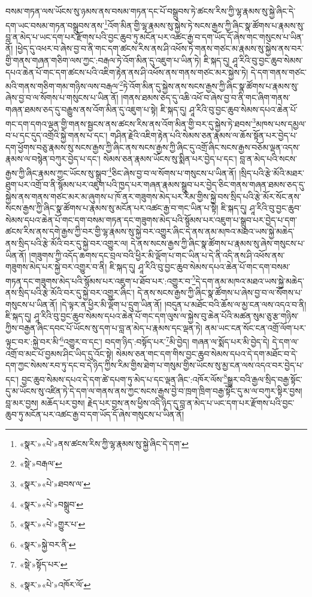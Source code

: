 བསམ་གཏན་ལས་ཡོངས་སུ་ཉམས་ནས་བསམ་གཏན་དང་པོ་བསྒྲུབས་ཏེ་ཚངས་རིས་ཀྱི་ལྷ་རྣམས་སུ་སྐྱེ་ཞིང་དེ་དག་ཡང་བསམ་གཏན་བསྒྲུབས་ནས་\footnote{«སྣར་»«པེ་»ནས་ཚངས་རིས་ཀྱི་ལྷ་རྣམས་སུ་སྐྱེ་ཞིང་དེ་དག་}འོག་མིན་གྱི་ལྷ་རྣམས་སུ་སྐྱེས་ཏེ་སངས་རྒྱས་ཀྱི་ཞིང་སྣ་ཚོགས་པ་རྣམས་སུ་བླ་ན་མེད་པ་ཡང་དག་པར་རྫོགས་པའི་བྱང་ཆུབ་ཏུ་མངོན་པར་འཚང་རྒྱ་བ་དག་ཡོད་དོ་ཞེས་གང་གསུངས་པ་ཡིན་ནོ། །ཕྱེད་དུ་འཕར་བ་ཞེས་བྱ་བ་ནི་གང་དག་ཚངས་རིས་ནས་ཤི་འཕོས་ཏེ་གནས་གཙང་མ་རྣམས་སུ་སྐྱེས་ནས་བར་གྱི་གནས་གཞན་གཅིག་ལས་ཀྱང་:བརྒལ་ཏེ་འོག་མིན་དུ་འཇུག་པ་ཡིན་ཏེ། ཇི་སྐད་དུ། ཤཱ་རིའི་བུ་བྱང་ཆུབ་སེམས་དཔའ་ཆེན་པོ་གང་དག་ཚངས་པའི་འཇིག་རྟེན་ནས་ཤི་འཕོས་ནས་གནས་གཙང་མར་སྐྱེས་ཏེ། དེ་དག་གནས་གཙང་མའི་གནས་གཅིག་གམ་གཉིས་ལས་བརྒལ་\footnote{«སྡེ་»བརྒལ་}ཏེ་འོག་མིན་དུ་སྐྱེས་ནས་སངས་རྒྱས་ཀྱི་ཞིང་སྣ་ཚོགས་པ་རྣམས་སུ་ཞེས་བྱ་བ་ལ་སོགས་པ་གསུངས་པ་ཡིན་ནོ། །གནས་ཐམས་ཅད་དུ་འཆི་འཕོ་བ་ཞེས་བྱ་བ་ནི་གང་ཞིག་གནས་གཞན་ཐམས་ཅད་དུ་བརྒྱུས་ནས་འོག་མིན་དུ་འཇུག་པ་སྟེ། ཇི་སྐད་དུ། ཤཱ་རིའི་བུ་བྱང་ཆུབ་སེམས་དཔའ་ཆེན་པོ་གང་དག་དགའ་ལྡན་གྱི་གནས་སྦྱངས་ནས་ཚངས་རིས་ནས་འོག་མིན་གྱི་བར་དུ་སྐྱེས་ཏེ་ཐབས་\footnote{«སྣར་»«པེ་»ཐབས་ལ་}མཁས་པས་དམྱལ་བ་པ་དང་དུད་འགྲོའི་སྐྱེ་གནས་པ་དང་། གཤིན་རྗེའི་འཇིག་རྟེན་པའི་སེམས་ཅན་རྣམས་ལ་ཆོས་སྟོན་པར་བྱེད་པ་དག་ཕྱོགས་བཅུ་རྣམས་སུ་སངས་རྒྱས་ཀྱི་ཞིང་ནས་སངས་རྒྱས་ཀྱི་ཞིང་དུ་འགྲོ་ཞིང་སངས་རྒྱས་བཅོམ་ལྡན་འདས་རྣམས་ལ་བསྙེན་བཀུར་བྱེད་པ་དང་། སེམས་ཅན་རྣམས་ཡོངས་སུ་སྨིན་པར་བྱེད་པ་དང་། བླ་ན་མེད་པའི་སངས་རྒྱས་ཀྱི་ཞིང་རྣམས་ཀྱང་ཡོངས་སུ་སྒྲུབ་\footnote{«སྣར་»«པེ་»བསྒྲུབ་}ཅིང་ཞེས་བྱ་བ་ལ་སོགས་པ་གསུངས་པ་ཡིན་ནོ། །སྲིད་པའི་རྩེ་མོའི་མཐར་ཐུག་པར་འགྲོ་བ་ནི་སྙོམས་པར་འཇུག་པའི་ཁྱད་པར་གཞན་རྣམས་སྒྲུབ་པར་བྱེད་ཅིང་གནས་གཞན་ཐམས་ཅད་དུ་སྐྱེས་ནས་གནས་གཙང་མར་མ་ཞུགས་པ་ཁོ་ནར་གཟུགས་མེད་པར་རིམ་གྱིས་སྐྱེ་བས་སྲིད་པའི་རྩེ་མོར་སོང་ནས་སངས་རྒྱས་ཀྱི་ཞིང་སྣ་ཚོགས་པ་རྣམས་སུ་མངོན་པར་འཚང་རྒྱ་བ་གང་ཡིན་པ་སྟེ། ཇི་སྐད་དུ། ཤཱ་རིའི་བུ་བྱང་ཆུབ་སེམས་དཔའ་ཆེན་པོ་གང་དག་བསམ་གཏན་དང་གཟུགས་མེད་པའི་སྙོམས་པར་འཇུག་པ་སྒྲུབ་པར་བྱེད་པ་དག་ཚངས་རིས་ནས་དགེ་རྒྱས་ཀྱི་བར་གྱི་ལྷ་རྣམས་སུ་སྐྱེ་བར་འགྱུར་ཞིང་དེ་ནས་ནམ་མཁའ་མཐའ་ཡས་སྐྱེ་མཆེད་ནས་སྲིད་པའི་རྩེ་མོའི་བར་དུ་སྐྱེ་བར་འགྱུར་ལ། དེ་ནས་སངས་རྒྱས་ཀྱི་ཞིང་སྣ་ཚོགས་པ་རྣམས་སུ་ཞེས་གསུངས་པ་ཡིན་ནོ། །གཟུགས་ཀྱི་འདོད་ཆགས་དང་བྲལ་བའི་ཕྱིར་མི་ལྡོག་པ་གང་ཡིན་པ་དེ་ནི་འདི་ནས་ཤི་འཕོས་ནས་གཟུགས་མེད་པར་སྐྱེ་བར་འགྱུར་བ་ནི། ཇི་སྐད་དུ། ཤཱ་རིའི་བུ་བྱང་ཆུབ་སེམས་དཔའ་ཆེན་པོ་གང་དག་བསམ་གཏན་དང་གཟུགས་མེད་པའི་སྙོམས་པར་འཇུག་པ་ཐོབ་པར་:འགྱུར་བ་\footnote{«སྣར་»«པེ་»གྱུར་པ་}དེ་དག་ནམ་མཁའ་མཐའ་ཡས་སྐྱེ་མཆེད་ནས་སྲིད་པའི་རྩེ་མོའི་བར་དུ་སྐྱེ་བར་འགྱུར་ཞིང་། དེ་ནས་སངས་རྒྱས་ཀྱི་ཞིང་སྣ་ཚོགས་པ་ཞེས་བྱ་བ་ལ་སོགས་པ་གསུངས་པ་ཡིན་ནོ། །དེ་ལྟར་ན་ཕྱིར་མི་ལྡོག་པ་དྲུག་ཡིན་ནོ། །བདུན་པ་མཐོང་བའི་ཆོས་ལ་མྱ་ངན་ལས་འདའ་བ་ནི། ཇི་སྐད་དུ། ཤཱ་རིའི་བུ་བྱང་ཆུབ་སེམས་དཔའ་ཆེན་པོ་གང་དག་ལུས་ལ་སྐྱེས་བུ་ཆེན་པོའི་མཚན་སུམ་ཅུ་རྩ་གཉིས་ཀྱིས་བརྒྱན་ཞིང་དབང་པོ་ཡོངས་སུ་དག་པ་བླ་ན་མེད་པ་རྣམས་དང་ལྡན་ཏེ། ནམ་ཡང་ངན་སོང་ངན་འགྲོ་ལོག་པར་ལྟུང་བར་:སྐྱེ་བར་མི་\footnote{«སྣར་»སྐྱེ་བར་ནི་}འགྱུར་བ་དང་། བདག་ཉིད་:བསྟོད་པར་\footnote{«སྡེ་»སྟོད་པར་}མི་བྱེད། གཞན་ལ་སྨོད་པར་མི་བྱེད་དེ། དེ་དག་ལ་འགྲོ་བ་མང་པོ་བྱམས་ཤིང་ཡིད་དུ་འོང་སྟེ། སེམས་ཅན་གང་དག་གིས་བྱང་ཆུབ་སེམས་དཔའ་དེ་དག་མཐོང་བ་དེ་དག་ཀྱང་སེམས་རབ་ཏུ་དང་བ་དེ་ཉིད་ཀྱིས་རིམ་གྱིས་ཐེག་པ་གསུམ་གྱིས་ཡོངས་སུ་མྱ་ངན་ལས་འདའ་བར་བྱེད་པ་དང་། བྱང་ཆུབ་སེམས་དཔའ་དེ་དག་ཚེ་དཔག་ཏུ་མེད་པ་དང་ལྡན་ཞིང་:འཁོར་ལོས་\footnote{«སྣར་»«པེ་»འཁོར་ལོ་}སྒྱུར་བའི་རྒྱལ་སྲིད་བརྒྱ་སྟོང་དུ་མ་ཡོངས་སུ་འཛིན་ཏེ་དེ་དག་ལ་གནས་ནས་ཀྱང་སངས་རྒྱས་བྱེ་བ་ཁྲག་ཁྲིག་བརྒྱ་སྟོང་དུ་མ་ལ་བཀུར་སྟིར་བྱས། བླ་མར་བྱས། མཆོད་པར་བྱས། རྗེད་པར་བྱས་ནས་ཕྱིས་འདི་ཉིད་དུ་བླ་ན་མེད་པ་ཡང་དག་པར་རྫོགས་པའི་བྱང་ཆུབ་ཏུ་མངོན་པར་འཚང་རྒྱ་བ་དག་ཡོད་དོ་ཞེས་གསུངས་པ་ཡིན་ནོ། 